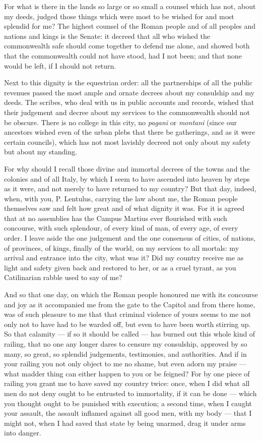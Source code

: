  For what is there in the lands so large or so small a counsel which has not, about my deeds, judged those things which were most to be wished for and most splendid for me? The highest counsel of the Roman people and of all peoples and nations and kings is the Senate: it decreed that all who wished the commonwealth safe should come together to defend me alone, and showed both that the commonwealth could not have stood, had I not been; and that none would be left, if I should not return.

 Next to this dignity is the equestrian order: all the partnerships of all the public revenues passed the most ample and ornate decrees about my consulship and my deeds. The scribes, who deal with us in public accounts and records, wished that their judgement and decree about my services to the commonwealth should not be obscure. There is no college in this city, no \textit{pagani} or \textit{montani} (since our ancestors wished even of the urban plebs that there be gatherings, and as it were certain councils), which has not most lavishly decreed not only about my safety but about my standing.

 For why should I recall those divine and immortal decrees of the towns and the colonies and of all Italy, by which I seem to have ascended into heaven by steps as it were, and not merely to have returned to my country? But that day, indeed, when, with you, P. Lentulus, carrying the law about me, the Roman people themselves saw and felt how great and of what dignity it was. For it is agreed that at no assemblies has the Campus Martius ever flourished with such concourse, with such splendour, of every kind of man, of every age, of every order. I leave aside the one judgement and the one consensus of cities, of nations, of provinces, of kings, finally of the world, on my services to all mortals: my arrival and entrance into the city, what was it? Did my country receive me as light and safety given back and restored to her, or as a cruel tyrant, as you Catilinarian rabble used to say of me?

 And so that one day, on which the Roman people honoured me with its concourse and joy as it accompanied me from the gate to the Capitol and from there home, was of such pleasure to me that that criminal violence of yours seems to me not only not to have had to be warded off, but even to have been worth stirring up. So that calamity --- if so it should be called --- has burned out this whole kind of railing, that no one any longer dares to censure my consulship, approved by so many, so great, so splendid judgements, testimonies, and authorities. And if in your railing you not only object to me no shame, but even adorn my praise --- what madder thing can either happen to you or be feigned? For by one piece of railing you grant me to have saved my country twice: once, when I did what all men do not deny ought to be entrusted to immortality, if it can be done --- which you thought ought to be punished with execution; a second time, when I caught your assault, the assault inflamed against all good men, with my body --- that I might not, when I had saved that state by being unarmed, drag it under arms into danger.

